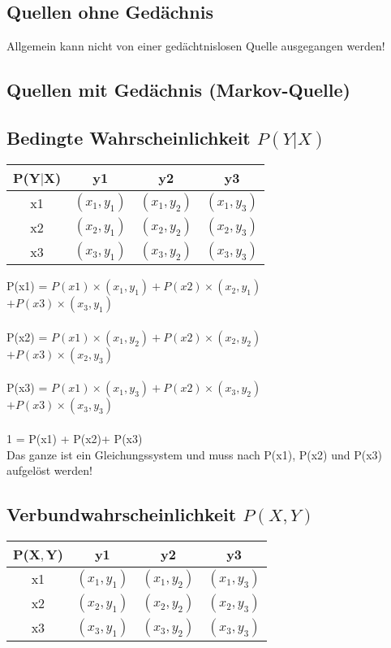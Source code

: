 \subsection{Quellen ohne Gedächnis}
Allgemein kann nicht von einer gedächtnislosen Quelle ausgegangen werden!




\subsection{Quellen mit Gedächnis (Markov-Quelle)}
\subsection{Bedingte Wahrscheinlichkeit $P(Y|X)$}
\begin{center}
\begin{tabular}{ |c|c|c|c| }
    \hline
    P(Y$|$X) & y1 & y2 & y3\\
    \hline
    x1 & $(x_1,y_1)$ & $(x_1,y_2)$ & $(x_1,y_3)$\\
    \hline
    x2 & $(x_2,y_1)$ & $(x_2,y_2)$ & $(x_2,y_3)$\\
    \hline
    x3 & $(x_3,y_1)$ & $(x_3,y_2)$ & $(x_3,y_3)$ \\
    \hline
\end{tabular}
\end{center}

\colorbox{lightlightgrey}{P(x1) = $P(x1) \times (x_1,y_1) + P(x2) \times (x_2,y_1) $}\\\colorbox{lightlightgrey}{$ + P(x3) \times (x_3,y_1)$}\\\\
\colorbox{lightlightgrey}{P(x2) = $P(x1) \times (x_1,y_2) + P(x2) \times (x_2,y_2) $}\\\colorbox{lightlightgrey}{$ + P(x3) \times (x_2,y_3)$}\\\\
\colorbox{lightlightgrey}{P(x3) = $P(x1) \times (x_1,y_3) + P(x2) \times (x_3,y_2) $}\\\colorbox{lightlightgrey}{$ + P(x3) \times (x_3,y_3)$}\\\\
\colorbox{lightlightgrey}{1 = P(x1) + P(x2)+ P(x3)}\\
Das ganze ist ein Gleichungssystem und muss nach P(x1), P(x2) und P(x3) aufgelöst werden!


\subsection{Verbundwahrscheinlichkeit $P(X,Y)$}
\begin{center}
\begin{tabular}{ |c|c|c|c| }
    \hline
    P(X$,$Y) & y1 & y2 & y3\\
    \hline
    x1 & $(x_1,y_1)$ & $(x_1,y_2)$ & $(x_1,y_3)$\\
    \hline
    x2 & $(x_2,y_1)$ & $(x_2,y_2)$ & $(x_2,y_3)$\\
    \hline
    x3 & $(x_3,y_1)$ & $(x_3,y_2)$ & $(x_3,y_3)$ \\
    \hline
\end{tabular}
\end{center}\\

